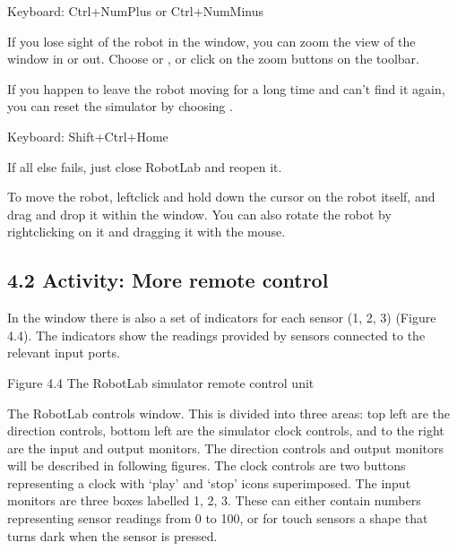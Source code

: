 \documentclass[letterpaper,10pt,english]{sphinxmanual}
\begin{document}
Keyboard: Ctrl+NumPlus or Ctrl+NumMinus





If you lose sight of the robot in the  window, you can zoom the view of the  window in or out. Choose  or , or click on the zoom  buttons on the toolbar.

If you happen to leave the robot moving for a long time and can’t find it again, you can reset the simulator by choosing .





Keyboard: Shift+Ctrl+Home





If all else fails, just close RobotLab and reopen it.

To move the robot, left\sphinxhyphen{}click and hold down the cursor on the robot itself, and drag and drop it within the  window. You can also rotate the robot by right\sphinxhyphen{}clicking on it and dragging it with the mouse.


\subsection{4.2 Activity: More remote control}
\label{\detokenize{content/00_SOFTWARE_GUIDE/Section_00_04_LEGACY_UNUSED_IGNORE:4.2-Activity:-More-remote-control}}
In the  window there is also a set of indicators for each sensor (1, 2, 3) (Figure 4.4). The indicators show the readings provided by sensors connected to the relevant input ports.

\noindent{}

Figure 4.4 The RobotLab simulator remote control unit

The RobotLab controls window. This is divided into three areas: top left are the direction controls, bottom left are the simulator clock controls, and to the right are the input and output monitors. The direction controls and output monitors will be described in following figures. The clock controls are two buttons representing a clock with ‘play’ and ‘stop’ icons superimposed. The input monitors are three boxes labelled 1, 2, 3. These can either contain numbers representing sensor readings from
0 to 100, or for touch sensors a shape that turns dark when the sensor is pressed.
\end{document}
